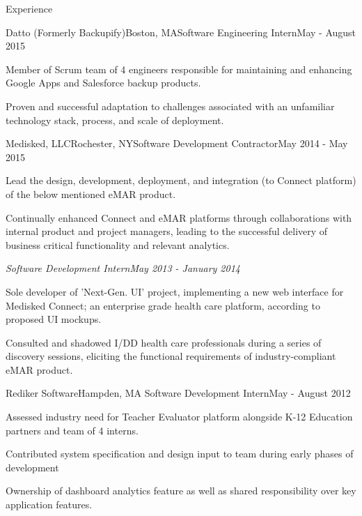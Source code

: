 \documentclass{resume} %
\begin{document}
\begin{rSection}{Experience}

\begin{rSubsection}{Datto (Formerly Backupify)}{Boston, MA}{Software Engineering Intern}{May - August 2015}
\item Member of Scrum team of 4 engineers responsible for maintaining and enhancing Google Apps and Salesforce backup products.
\item Proven and successful adaptation to challenges associated with an unfamiliar technology stack, process, and scale of deployment.  
\end{rSubsection}


\begin{rSubsection}{Medisked, LLC}{Rochester, NY}{Software Development Contractor}{May 2014 - May 2015}
\item Lead the design, development, deployment, and integration (to Connect platform) of the below mentioned eMAR product.
\item Continually enhanced Connect and eMAR platforms through collaborations with internal product and project managers, leading to the successful delivery of business critical functionality and relevant analytics.

{\sl Software Development Intern}\hfill{\sl May 2013 - January 2014}
\item Sole developer of 'Next-Gen. UI' project, implementing a new web interface for Medisked Connect; an enterprise grade health care platform, according to proposed UI mockups.
\item Consulted and shadowed I/DD health care professionals during a series of discovery sessions, eliciting the functional 	requirements of industry-compliant eMAR product.   
\end{rSubsection}


\begin{rSubsection}{Rediker Software}{Hampden, MA}
{Software Development Intern}{May - August 2012}
\item Assessed industry need for Teacher Evaluator platform alongside K-12 Education partners and team of 4 interns.
\item Contributed system specification and design input to team during early phases of development
\item Ownership of dashboard analytics feature as well as shared responsibility over key application features.
\end{rSubsection}

\end{rSection}
\end{document}
